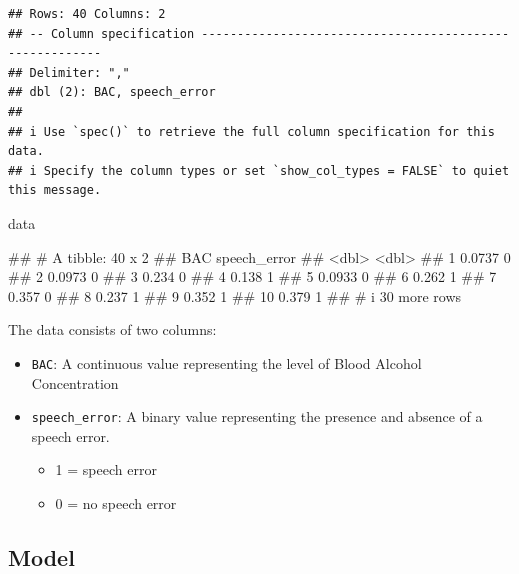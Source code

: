 \documentclass[
]{book}
\newenvironment{Shaded}{\begin{snugshade}}{\end{snugshade}}
\newcommand{\NormalTok}[1]{#1}
\providecommand{\tightlist}{%
  \setlength{\itemsep}{0pt}\setlength{\parskip}{0pt}}
\begin{document}
\begin{verbatim}
## Rows: 40 Columns: 2
## -- Column specification --------------------------------------------------------
## Delimiter: ","
## dbl (2): BAC, speech_error
## 
## i Use `spec()` to retrieve the full column specification for this data.
## i Specify the column types or set `show_col_types = FALSE` to quiet this message.
\end{verbatim}

\begin{Shaded}
\begin{Highlighting}[]
\NormalTok{data}
\end{Highlighting}
\end{Shaded}

\begin{Shaded}
\begin{Highlighting}[]
\NormalTok{\#\# \# A tibble: 40 x 2}
\NormalTok{\#\#       BAC speech\_error}
\NormalTok{\#\#     \textless{}dbl\textgreater{}        \textless{}dbl\textgreater{}}
\NormalTok{\#\#  1 0.0737            0}
\NormalTok{\#\#  2 0.0973            0}
\NormalTok{\#\#  3 0.234             0}
\NormalTok{\#\#  4 0.138             1}
\NormalTok{\#\#  5 0.0933            0}
\NormalTok{\#\#  6 0.262             1}
\NormalTok{\#\#  7 0.357             0}
\NormalTok{\#\#  8 0.237             1}
\NormalTok{\#\#  9 0.352             1}
\NormalTok{\#\# 10 0.379             1}
\NormalTok{\#\# \# i 30 more rows}
\end{Highlighting}
\end{Shaded}

The data consists of two columns:

\begin{itemize}
\tightlist
\item
  \texttt{BAC}: A continuous value representing the level of Blood Alcohol Concentration
\item
  \texttt{speech\_error}: A binary value representing the presence and absence of a speech error.

  \begin{itemize}
  \tightlist
  \item
    1 = speech error
  \item
    0 = no speech error
  \end{itemize}
\end{itemize}

\subsection{Model}\label{model}
\end{document}
